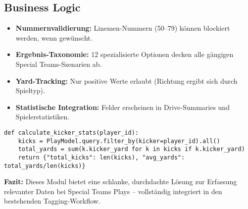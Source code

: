 \documentclass[12pt]{article}
\begin{document}
\subsection{Business Logic}

\begin{itemize}
  \item \textbf{Nummernvalidierung:} Linemen-Nummern (50–79) können blockiert werden, wenn gewünscht.
  \item \textbf{Ergebnis-Taxonomie:} 12 spezialisierte Optionen decken alle gängigen Special Teams-Szenarien ab.
  \item \textbf{Yard-Tracking:} Nur positive Werte erlaubt (Richtung ergibt sich durch Spieltyp).
  \item \textbf{Statistische Integration:} Felder erscheinen in Drive-Summaries und Spielerstatistiken.
\end{itemize}

\begin{verbatim}
def calculate_kicker_stats(player_id):
    kicks = PlayModel.query.filter_by(kicker=player_id).all()
    total_yards = sum(k.kicker_yard for k in kicks if k.kicker_yard)
    return {"total_kicks": len(kicks), "avg_yards": total_yards/len(kicks)}
\end{verbatim}

\textbf{Fazit:} Dieses Modul bietet eine schlanke, durchdachte Lösung zur Erfassung relevanter Daten bei Special Teams Plays – vollständig integriert in den bestehenden Tagging-Workflow.
\end{document}
